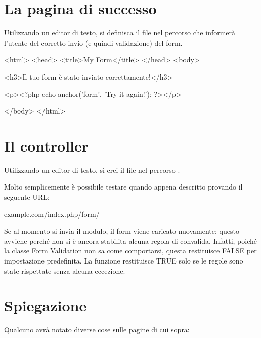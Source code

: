 \section*{La pagina di successo}
Utilizzando un editor di testo, si definisca il file  nel percorso  che informerà l'utente del corretto invio (e quindi validazione) del form.

\begin{html}
<html>
<head>
<title>My Form</title>
</head>
<body>

<h3>Il tuo form è stato inviato correttamente!</h3>

<p><?php echo anchor('form', 'Try it again!'); ?></p>

</body>
</html>
\end{html}

\section*{Il controller}
Utilizzando un editor di testo, si crei il file  nel percorso .


Molto semplicemente è possibile testare quando appena descritto provando il seguente \ac{URL}:

\begin{code}
example.com/index.php/form/
\end{code}

Se al momento si invia il modulo, il form viene caricato nuovamente: questo avviene perché non si è ancora stabilita alcuna regola di convalida. Infatti, poiché la classe Form Validation non sa come comportarsi, questa restituisce FALSE per impostazione predefinita. La funzione  restituisce TRUE solo se le regole sono state rispettate senza alcuna eccezione.

\section*{Spiegazione}
Qualcuno avrà notato diverse cose sulle pagine di cui sopra:

